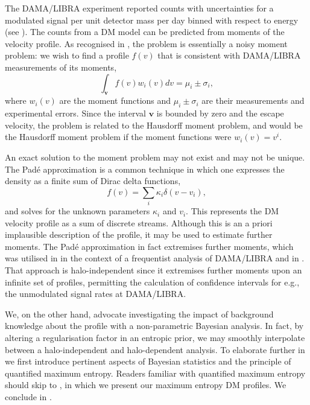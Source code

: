 \documentclass{article}
\begin{document}
The DAMA/LIBRA experiment reported counts with uncertainties for a modulated signal per unit detector mass per day binned with respect to energy (see ). The counts from a DM model can be predicted from moments of the velocity profile. As recognised in , the problem is essentially a noisy moment problem: we wish to find a profile $f(v)$ that is consistent with DAMA/LIBRA measurements of its moments,
\begin{equation}
\int_{\mathbf v} f(v) w_i(v) dv = \mu_i \pm \sigma_i,
\end{equation}
where $w_i(v)$ are the moment functions and $\mu_i \pm \sigma_i$ are their measurements and experimental errors. Since the interval $\mathbf v$ is bounded by zero and the escape velocity, the problem is related to the Hausdorff moment problem, and would be the Hausdorff moment problem if the moment functions were $w_i(v) = v^i$.

An exact solution to the moment problem may not exist and may not be unique. The Pad\'e approximation is a common technique in which one expresses the density as a finite sum of Dirac delta functions,
\begin{equation}
f(v) = \sum_i \kappa_i \delta(v - v_i),    
\end{equation}
and solves for the unknown parameters $\kappa_i$ and $v_i$. This represents the DM velocity profile as a sum of discrete streams. Although this is an a priori implausible description of the profile, it may be used to estimate further moments. The Pad\'e approximation in fact extremises further moments, which was utilised in  in the context of a frequentist analysis of DAMA/LIBRA and in . That approach is halo-independent since it extremises further moments upon an infinite set of profiles, permitting the calculation of confidence intervals for e.g., the unmodulated signal rates at DAMA/LIBRA.

We, on the other hand, advocate investigating the impact of background knowledge about the profile with a non-parametric Bayesian analysis. In fact, by altering a regularisation factor in an entropic prior, we may smoothly interpolate between a halo-independent and halo-dependent analysis. To elaborate further in  we first introduce pertinent aspects of Bayesian statistics and the principle of quantified maximum entropy. Readers familiar with quantified maximum entropy should skip to , in which we present our maximum entropy DM profiles. We conclude in .
\end{document}

